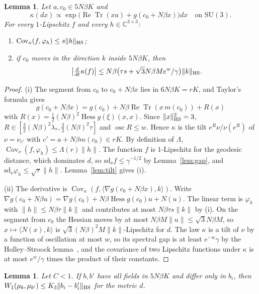 \documentclass[aps,prd,twocolumn,superscriptaddress,nofootinbib,longbibliography,floatfix,amsmath,amssymb,10pt]{revtex4-2}
\newtheorem{lemma}[theorem]{Lemma}
\theoremstyle{definition}
\theoremstyle{remark}
\newcommand{\C}{\mathbb{C}}
\newcommand{\SU}{\mathrm{SU}}
\newcommand{\ReTr}{\operatorname{Re}\operatorname{Tr}}
\newcommand{\Hess}{\operatorname{Hess}}
\newcommand{\Cov}{\operatorname{Cov}}
\newcommand{\ip}[2]{\langle #1,#2\rangle}
\begin{document}
\begin{lemma}\label{lem:onesite3}
Let $a,c_0\in5N\beta K$ and
\[
\kappa(dx)\propto\exp\bigl(\ReTr(xa)+g(c_0+N\beta x)\bigr)dx\quad\text{on }
\SU(3).
\]
For every $1$-Lipschitz $f$ and every $h\in\C^{3\times3}$:
\begin{enumerate}[label=\textup{(\roman*)},leftmargin=*]
\item $\Cov_\kappa(f,\varphi_h)\le s\|h\|_{\rm HS}$;
\item if $c_0$ moves in the direction $k$ inside $5N\beta K$, then
\[
\bigl|\tfrac{d}{dt}\kappa(f)\bigr|\le N\beta\bigl(\tau s+\sqrt3N\beta
Me^w/\gamma\bigr)\|k\|_{\rm HS}.
\]
\end{enumerate}
\end{lemma}

\begin{proof}
(i) The segment from $c_0$ to $c_0+N\beta x$ lies in $6N\beta K=rK$, and
Taylor's formula gives
\[
g(c_0+N\beta x)=g(c_0)+N\beta\ReTr(x\,m(c_0))+R(x)
\]
with $R(x)=\frac12(N\beta)^2\Hess g(\xi)(x,x)$. Since $\|x\|_{\rm HS}^2=3$,
$R\in[\frac32(N\beta)^2\lambda_*,\frac32(N\beta)^2\tau]$ and $\operatorname{osc}
R\le w$. Hence $\kappa$ is the tilt $e^R\nu/\nu(e^R)$ of $\nu=\nu_{c'}$ with
$c'=a+N\beta m(c_0)\in rK$. By definition of $\Lambda$, $\Cov_\nu(f,\varphi_h)
\le\Lambda(r)\|h\|$. The function $f$ is $1$-Lipschitz for the geodesic
distance, which dominates $d$, so $\mathrm{sd}_\nu f\le\gamma^{-1/2}$ by
Lemma~\ref{lem:gap}, and $\mathrm{sd}_\nu\varphi_h\le\sqrt\tau\|h\|$.
Lemma~\ref{lem:tilt} gives (i).

(ii) The derivative is $\Cov_\kappa(f,\ip{\nabla g(c_0+N\beta x)}k)$. Write
$\nabla g(c_0+N\beta u)=\nabla g(c_0)+N\beta\Hess g(c_0)u+N(u)$. The linear
term is $\varphi_h$ with $\|h\|\le N\beta\tau\|k\|$ and contributes at most
$N\beta\tau s\|k\|$ by (i). On the segment from $c_0$ the Hessian moves by at
most $N\beta M\|u\|\le\sqrt3N\beta M$, so $x\mapsto\ip{N(x)}k$ is
$\sqrt3(N\beta)^2M\|k\|$-Lipschitz for $d$. The law $\kappa$ is a tilt of
$\nu$ by a function of oscillation at most $w$, so its spectral gap is at
least $e^{-w}\gamma$ by the Holley--Stroock lemma~\cite{HS87}, and the
covariance of two Lipschitz functions under $\kappa$ is at most $e^w/\gamma$
times the product of their constants.
\end{proof}

\begin{lemma}\label{lem:blockK3}
Let $C<1$. If $b,b'$ have all fields in $5N\beta K$ and differ only in $b_i$,
then $W_1(\mu_b,\mu_{b'})\le K_3\|b_i-b'_i\|_{\rm HS}$ for the metric $d$.
\end{lemma}
\end{document}
